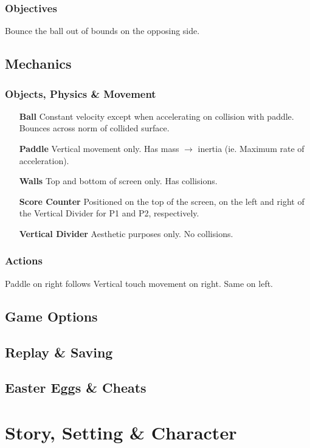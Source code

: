 \documentclass[12pt, letterpaper]{article}
\begin{document}
        \subsubsection{Objectives}
        Bounce the ball out of bounds on the opposing side.
    \subsection{Mechanics}
        \subsubsection{Objects, Physics \& Movement}
        \begin{itemize}
            \item[\textbf{Ball}] Constant velocity except when accelerating on collision with paddle. Bounces across norm of collided surface.
            \item[\textbf{Paddle}] Vertical movement only. Has mass $\rightarrow$ inertia (ie. Maximum rate of acceleration).
            \item[\textbf{Walls}] Top and bottom of screen only. Has collisions.
            \item[\textbf{Score Counter}] Positioned on the top of the screen, on the left and right of the Vertical Divider for P1 and P2, respectively.
            \item[\textbf{Vertical Divider}] Aesthetic purposes only. No collisions. 
        \end{itemize}
        \subsubsection{Actions}
            Paddle on right follows Vertical touch movement on right. Same on left.
    \subsection{Game Options}
    \subsection{Replay \& Saving}
    \subsection{Easter Eggs \& Cheats}
\section{Story, Setting \& Character}
\end{document}
